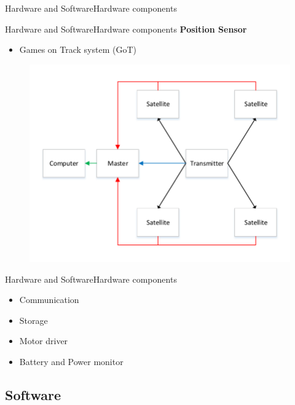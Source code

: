 \begin{frame}{Hardware and Software}{Hardware components}
\begin{minipage}{\linewidth}
\begin{minipage}{0.45\linewidth}
\begin{figure}[H]
  			\centering
  		\end{figure}
  	\end{minipage}
  \end{minipage}

\end{frame}




\begin{frame}{Hardware and Software}{Hardware components}
\textbf{Position Sensor}
\begin{itemize}
\item{Games on Track system (GoT)}
\end{itemize}
  \begin{figure}[H]
	\centering
	\includegraphics[scale=0.6]{Pictures/GOTNew.pdf}
  \end{figure}
\end{frame}

\begin{frame}{Hardware and Software}{Hardware components}
\begin{itemize}
\item {Communication}
\item {Storage}
\item {Motor driver}
\item {Battery and Power monitor}
\end{itemize}
\end{frame}

\subsection{Software}


